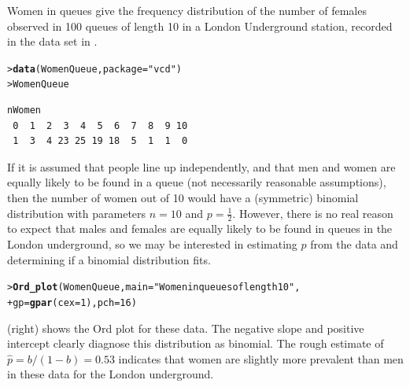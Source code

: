 \documentclass[10pt,krantz2]{krantz}\usepackage[]{graphicx}\usepackage[]{color}
\makeatletter
\newcommand{\hlnum}[1]{\textcolor[rgb]{0.686,0.059,0.569}{#1}}%
\newcommand{\hlstr}[1]{\textcolor[rgb]{0.192,0.494,0.8}{#1}}%
\newcommand{\hlstd}[1]{\textcolor[rgb]{0.345,0.345,0.345}{#1}}%
\newcommand{\hlkwc}[1]{\textcolor[rgb]{0.333,0.667,0.333}{#1}}%
\newcommand{\hlkwd}[1]{\textcolor[rgb]{0.737,0.353,0.396}{\textbf{#1}}}%
\newenvironment{kframe}{%
 \def\at@end@of@kframe{}%
 \ifinner\ifhmode%
  \def\at@end@of@kframe{\end{minipage}}%
  \begin{minipage}{\columnwidth}%
 \fi\fi%
 \def\FrameCommand##1{\hskip\@totalleftmargin \hskip-\fboxsep
 \colorbox{shadecolor}{##1}\hskip-\fboxsep
     \hskip-\linewidth \hskip-\@totalleftmargin \hskip\columnwidth}%
 \MakeFramed {\advance\hsize-\width
   \@totalleftmargin\z@ \linewidth\hsize
   \@setminipage}}%
 {\par\unskip\endMakeFramed%
 \at@end@of@kframe}
\newenvironment{knitrout}{}{} %
\renewenvironment{knitrout}{\small\renewcommand{\baselinestretch}{.85}}{} %
\makeatother
\begin{document}
\begin{Example}[queues]{Women in queues}
\citet{JinkinsonSlater:81,HoaglinTukey:85}
give the frequency distribution of the number of females observed in 100
queues of length 10 in a London Underground station, recorded
in the data set  in .
\begin{knitrout}
\color{fgcolor}\begin{kframe}
\begin{alltt}
\hlstd{> }\hlkwd{data}\hlstd{(WomenQueue,} \hlkwc{package} \hlstd{=} \hlstr{"vcd"}\hlstd{)}
\hlstd{> }\hlstd{WomenQueue}
\end{alltt}
\begin{verbatim}
nWomen
 0  1  2  3  4  5  6  7  8  9 10 
 1  3  4 23 25 19 18  5  1  1  0 
\end{verbatim}
\end{kframe}
\end{knitrout}

If it is assumed that people line up independently, and that
men and women are equally likely to be found in a queue
(not necessarily reasonable assumptions),
then the number of women out of 10
would have a (symmetric) binomial distribution with parameters $n=10$ and
$p=\frac12$.
However, there is no real reason to expect that males and females are
equally likely to be found in queues in the London underground,
so we may be interested in estimating $p$ from the data
and determining if a binomial distribution fits.

\begin{knitrout}
\color{fgcolor}\begin{kframe}
\begin{alltt}
\hlstd{> }\hlkwd{Ord_plot}\hlstd{(WomenQueue,} \hlkwc{main} \hlstd{=} \hlstr{"Women in queues of length 10"}\hlstd{,}
\hlstd{+ }         \hlkwc{gp} \hlstd{=} \hlkwd{gpar}\hlstd{(}\hlkwc{cex} \hlstd{=} \hlnum{1}\hlstd{),} \hlkwc{pch} \hlstd{=} \hlnum{16}\hlstd{)}
\end{alltt}
\end{kframe}
\end{knitrout}
 (right) shows the Ord plot for these data.
The negative slope and positive intercept clearly diagnose this distribution
as binomial.  The rough estimate of $\hat{p} = b/(1-b) = 0.53$ indicates that
women are slightly more prevalent than men in these data for the London
underground.
\end{Example}
\end{document}

